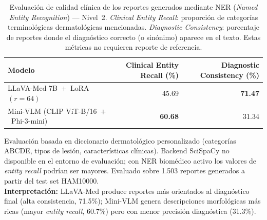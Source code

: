 \begin{table}[htbp]
\centering
\caption{%
  Evaluación de calidad clínica de los reportes generados
  mediante NER (\textit{Named Entity Recognition}) — Nivel~2.
  \textit{Clinical Entity Recall}: proporción de categorías
  terminológicas dermatológicas mencionadas.
  \textit{Diagnostic Consistency}: porcentaje de reportes donde
  el diagnóstico correcto (o sinónimo) aparece en el texto.
  Estas métricas no requieren reporte de referencia.
}
\label{tab:nivel2_ner}
\begin{tabular}{@{}lrr@{}}
\toprule
\textbf{Modelo}
  & \textbf{Clinical Entity Recall (\%)}
  & \textbf{Diagnostic Consistency (\%)} \\
\midrule
\rowcolor{thiswork}
LLaVA-Med 7B~$+$~LoRA~$(r{=}64)$
  & 45.69
  & \textbf{71.47} \\
\rowcolor{thiswork}
Mini-VLM (CLIP ViT-B/16~$+$~Phi-3-mini)
  & \textbf{60.68}
  & 31.34 \\
\bottomrule
\end{tabular}
\vspace{4pt}
\begin{minipage}{0.95\textwidth}
  \footnotesize
  Evaluación basada en diccionario dermatológico personalizado
  (categorías ABCDE, tipos de lesión, características clínicas).
  Backend SciSpaCy no disponible en el entorno de evaluación;
  con NER biomédico activo los valores de \textit{entity recall}
  podrían ser mayores.
  Evaluado sobre 1.503 reportes generados a partir del test set HAM10000.\\[4pt]
  \textbf{Interpretación:} LLaVA-Med produce reportes más orientados
  al diagnóstico final (alta consistencia, 71.5\%);
  Mini-VLM genera descripciones morfológicas más ricas
  (mayor \textit{entity recall}, 60.7\%) pero con menor
  precisión diagnóstica (31.3\%).
\end{minipage}
\end{table}


